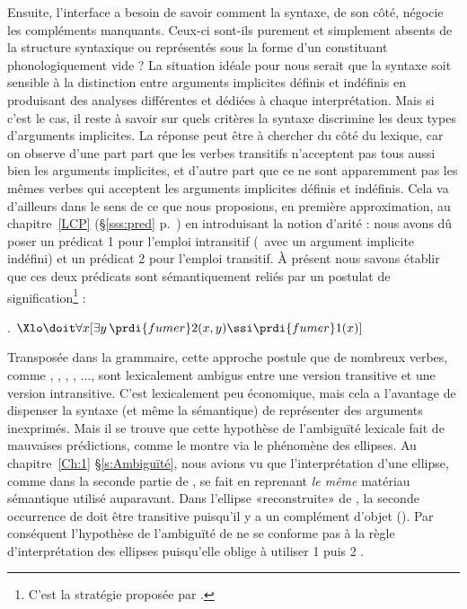 \largerpage

Ensuite, l'interface a besoin de savoir comment la syntaxe, de son côté, négocie les compléments manquants.  Ceux-ci sont-ils purement et simplement absents de la structure syntaxique ou représentés sous la forme d'un constituant phonologiquement vide ?  La situation idéale pour nous serait que la syntaxe soit sensible à la distinction entre arguments implicites définis et indéfinis en produisant des analyses différentes et dédiées à chaque interprétation.
Mais si c'est le cas, il reste à savoir sur quels critères la syntaxe discrimine les deux types d'arguments implicites.  
La réponse peut être à chercher du côté du lexique, car on observe d'une part part que les verbes transitifs n'acceptent pas tous aussi bien les arguments implicites, et d'autre part que ce ne sont apparemment pas les mêmes verbes qui acceptent les arguments implicites définis et indéfinis.
Cela va d'ailleurs dans le sens de ce que nous proposions, en première approximation, au chapitre~\ref{LCP} (\S\ref{sss:pred} p.~\pageref{H:aritéfixe}) en introduisant la notion d'arité : nous avons dû poser un prédicat 1 pour l'emploi intransitif (\ie\ avec un argument implicite indéfini) et un prédicat 2 pour l'emploi transitif.  À présent nous savons établir que ces deux prédicats sont sémantiquement reliés par un postulat de signification\footnote{C'est la stratégie proposée par \citet{FodorFodor:80}.} :

\ex.
\(\Xlo\doit\forall x[\exists y\,\prdi{fumer}2(x,y)\ssi\prdi{fumer}1(x)]\)

  
\sloppy
Transposée dans la grammaire, cette approche postule que de nombreux verbes, comme , , , , ..., sont lexicalement ambigus entre une version transitive et une version intransitive.  C'est lexicalement peu économique, mais cela a l'avantage de dispenser la syntaxe (et même la sémantique) de représenter des arguments inexprimés.  
Mais il se trouve que cette hypothèse de l'ambiguïté lexicale fait de mauvaises prédictions, comme le montre \citet{Gillon:12} via le phénomène des ellipses.  Au chapitre~\ref{Ch:1} \S\ref{s:Ambiguïté}, nous avions vu que l'interprétation d'une ellipse, comme dans la seconde partie de \Next[a], se fait en reprenant \emph{le même} matériau sémantique utilisé auparavant. Dans l'ellipse «reconstruite» de \Next[a], la seconde occurrence de  doit être transitive puisqu'il y a un complément d'objet (). Par conséquent l'hypothèse de l'ambiguïté de  ne se conforme pas à la règle d'interprétation des ellipses puisqu'elle oblige à utiliser 1 puis 2 \Next[b]. 

